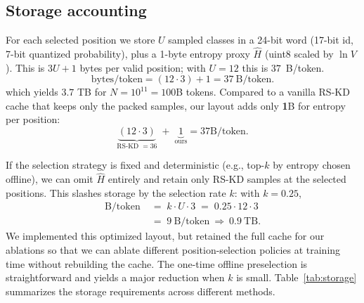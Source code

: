 \documentclass[11pt]{article}
\begin{document}
\subsection{Storage accounting}
For each selected position we store $U$ sampled classes in a 24-bit word (17-bit id, 7-bit quantized probability), plus a 1-byte entropy proxy $\hat H$ (uint8 scaled by $\ln V$).
This is $3U+1$ bytes per valid position; with $U{=}12$ this is $37$~B/token.
\[
	\text{bytes/token} = (12 \cdot 3) + 1 = 37\ \text{B/token}.
\]
which yields $3.7$ TB for $N{=}10^{11}{=}100$B tokens. Compared to a vanilla RS-KD cache that keeps only the packed samples, our layout adds only \textbf{1}B for entropy per position:
\[
	\underbrace{(12 \cdot 3)}_{\text{RS-KD }=36} \;+\; \underbrace{1}_{\text{ours}}
	= 37\text{B/token}.
\]

If the selection strategy is fixed and deterministic (e.g., top-$k$ by entropy chosen offline), we can omit $\hat H$ entirely and retain only RS-KD samples at the selected positions. This slashes storage by the selection rate $k$: with $k{=}0.25$,
\begin{align*}
	\text{B/token} \; & =\; k \cdot U \cdot 3
	\;=\; 0.25 \cdot 12 \cdot 3                                                \\
	\;                & =\; 9~\text{B/token} \ \Longrightarrow\ 0.9~\text{TB}.
\end{align*}
We implemented this optimized layout, but retained the full cache for our ablations so that we can ablate different position-selection policies at training time without rebuilding the cache. The one-time offline preselection is straightforward and yields a major reduction when $k$ is small.
Table~\ref{tab:storage} summarizes the storage requirements across different methods.
\end{document}
